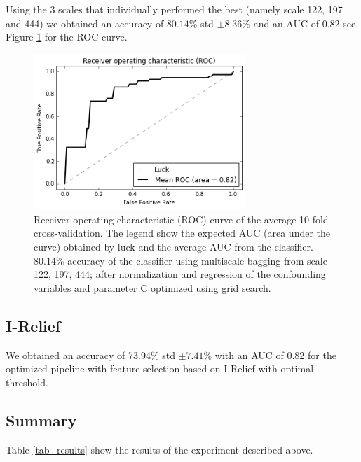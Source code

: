 \documentclass[12pt,journal,compsoc]{IEEEtran}
\begin{document}
Using the 3 scales that individually performed the best (namely scale 122, 197 and 444) we obtained an accuracy of $80.14\%$ std $\pm8.36\%$ and an AUC of 0.82 see Figure \ref{fig_svc_bagging_multiscale} for the ROC curve.


\begin{figure}[h]
\centering
\includegraphics[width=8cm]{svc_linear_multiscale_bagging.png}
\caption{Receiver operating characteristic (ROC) curve of the average 10-fold cross-validation. The legend show the expected AUC (area under the curve) obtained by luck and the average AUC from the classifier. 80.14\% accuracy of the classifier using multiscale bagging from scale 122, 197, 444; after normalization and regression of the confounding variables and parameter C optimized using grid search.}
\label{fig_svc_bagging_multiscale}
\end{figure}

\subsection{I-Relief}

We obtained an accuracy of 73.94\% std $\pm7.41\%$ with an AUC of 0.82 for the optimized pipeline with feature selection based on I-Relief with optimal threshold.

\subsection{Summary}
Table \ref{tab_results} show the results of the experiment described above.
\end{document}
